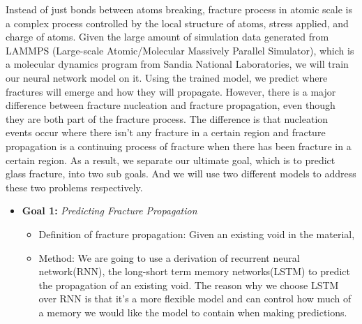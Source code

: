 
Instead of just bonds between atoms breaking, fracture process in atomic scale is a complex process controlled by the local structure of atoms, stress applied, and charge of atoms. 
Given the large amount of simulation data generated from LAMMPS (Large-scale Atomic/Molecular Massively Parallel Simulator), which is a molecular dynamics program from Sandia National Laboratories, we will train our neural network model on it. Using the trained model, we predict where fractures will emerge and how they will propagate. However, there is a major difference between fracture nucleation and fracture propagation, even though they are both part of the fracture process. The difference is that nucleation events occur where there isn't any fracture in a certain region and fracture propagation is a continuing process of fracture when there has been fracture in a certain region. As a result, we separate our ultimate goal, which is to predict glass fracture, into two sub goals. And we will use two different models to address these two problems respectively. 


\begin{itemize}
\item \textbf{Goal 1:} \emph{Predicting Fracture Propagation} 
\begin{itemize} 
    \item Definition of fracture propagation: Given an existing void in the material,
    \item Method: We are going to use a derivation of recurrent neural network(RNN), the long-short term memory networks(LSTM) to predict the propagation of an existing void. The reason why we choose LSTM over RNN is that it's a more flexible model and can control how much of a memory we would like the model to contain when making predictions.
    
\end{itemize}



\end{itemize}




